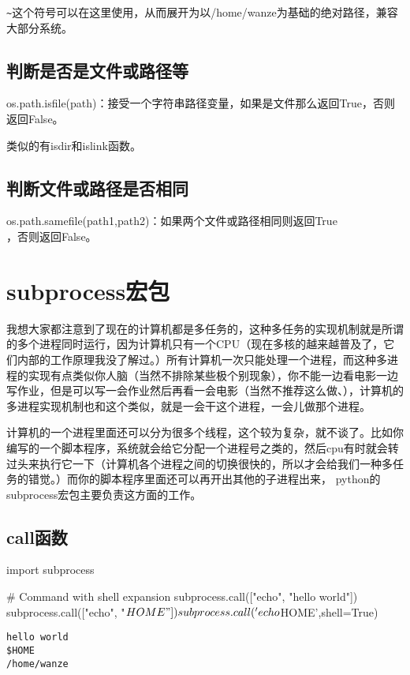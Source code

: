 \documentclass[12pt,oneside]{book}
\begin{document}
\begin{common-format}
\verb+~+这个符号可以在这里使用，从而展开为以/home/wanze为基础的绝对路径，兼容大部分系统。




\section{判断是否是文件或路径等}
os.path.isfile(path)：接受一个字符串路径变量，如果是文件那么返回True，否则返回False。

类似的有isdir和islink函数。

\section{判断文件或路径是否相同}
os.path.samefile(path1,path2)：如果两个文件或路径相同则返回True\\，否则返回False。


\chapter{subprocess宏包}
我想大家都注意到了现在的计算机都是多任务的，这种多任务的实现机制就是所谓的多个进程同时运行，因为计算机只有一个CPU（现在多核的越来越普及了，它们内部的工作原理我没了解过。）所有计算机一次只能处理一个进程，而这种多进程的实现有点类似你人脑（当然不排除某些极个别现象），你不能一边看电影一边写作业，但是可以写一会作业然后再看一会电影（当然不推荐这么做、），计算机的多进程实现机制也和这个类似，就是一会干这个进程，一会儿做那个进程。

计算机的一个进程里面还可以分为很多个线程，这个较为复杂，就不谈了。比如你编写的一个脚本程序，系统就会给它分配一个进程号之类的，然后cpu有时就会转过头来执行它一下（计算机各个进程之间的切换很快的，所以才会给我们一种多任务的错觉。）而你的脚本程序里面还可以再开出其他的子进程出来， python的subprocess宏包主要负责这方面的工作。

\section{call函数}
\begin{tcbpython}[]
import subprocess

# Command with shell expansion
subprocess.call(["echo", "hello world"])
subprocess.call(["echo", "$HOME"])
subprocess.call('echo $HOME',shell=True)
\end{tcbpython}
\begin{Verbatim}
hello world
$HOME
/home/wanze
\end{Verbatim}


\end{common-format}
\end{document}
